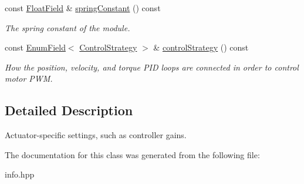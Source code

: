 \begin{DoxyCompactItemize}
const \hyperlink{classhebi_1_1Info_1_1FloatField}{Float\+Field} \& \hyperlink{classhebi_1_1Info_1_1Settings_1_1Actuator_a84fe005a588fd55a78dcbe3dcb8db798}{spring\+Constant} () const
\begin{DoxyCompactList}\small\item\em The spring constant of the module. \end{DoxyCompactList}\item 
\mbox{\label{classhebi_1_1Info_1_1Settings_1_1Actuator_a604e1fdf4ff6ea9a6350d7c8f853ccdd}} 
const \hyperlink{classhebi_1_1Info_1_1EnumField}{Enum\+Field}$<$ \hyperlink{classhebi_1_1Info_a154026587295ad17a3e1460f32dab668}{Control\+Strategy} $>$ \& \hyperlink{classhebi_1_1Info_1_1Settings_1_1Actuator_a604e1fdf4ff6ea9a6350d7c8f853ccdd}{control\+Strategy} () const
\begin{DoxyCompactList}\small\item\em How the position, velocity, and torque P\+ID loops are connected in order to control motor P\+WM. \end{DoxyCompactList}\end{DoxyCompactItemize}


\subsection{Detailed Description}
Actuator-\/specific settings, such as controller gains. 

The documentation for this class was generated from the following file\+:\begin{DoxyCompactItemize}
\item 
info.\+hpp\end{DoxyCompactItemize}
